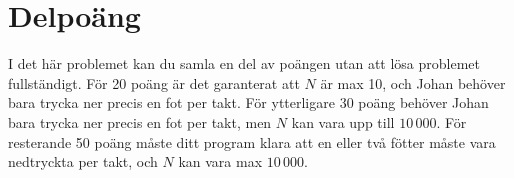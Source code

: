 \section*{Delpoäng}
I det här problemet kan du samla en del av poängen utan att lösa problemet fullständigt. För 20 poäng är det garanterat att $N$ är max 10, och Johan behöver bara trycka ner precis en fot per takt. För ytterligare 30 poäng behöver Johan bara trycka ner precis en fot per takt, men $N$ kan vara upp till $10\,000$. För resterande 50 poäng måste ditt program klara att en eller två fötter måste vara nedtryckta per takt, och $N$ kan vara max $10\,000$.
